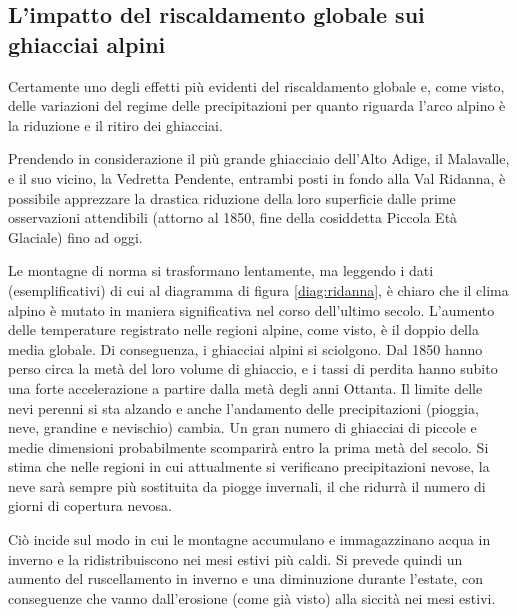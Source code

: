 \documentclass[14pt,a4paper]{article}
\begin{document}
	\subsection{L'impatto del riscaldamento globale sui ghiacciai alpini}
		Certamente uno degli effetti più evidenti del riscaldamento globale e, come visto, delle variazioni del regime delle precipitazioni  per quanto riguarda l'arco alpino è la riduzione e il ritiro dei ghiacciai.
		
		Prendendo in considerazione il più grande ghiacciaio dell'Alto Adige, il Malavalle, e il suo vicino, la Vedretta Pendente, entrambi posti in fondo alla Val Ridanna, è possibile apprezzare la drastica riduzione della loro superficie dalle prime osservazioni attendibili (attorno al 1850, fine della cosiddetta Piccola Età Glaciale) fino ad oggi. \cite{monteneve}
		
		Le montagne di norma si trasformano lentamente, ma leggendo i dati (esemplificativi) di cui al diagramma di figura \ref{diag:ridanna}, è chiaro che il clima alpino è mutato in
		maniera significativa nel corso dell'ultimo secolo. L'aumento delle temperature registrato nelle regioni alpine, come visto, è il doppio della media
		globale. Di conseguenza, i ghiacciai alpini si sciolgono. Dal 1850 hanno perso circa la metà del loro volume di
		ghiaccio, e i tassi di perdita hanno subito una forte accelerazione a partire dalla metà degli anni Ottanta.
		Il limite delle nevi perenni si sta alzando e anche l'andamento delle precipitazioni (pioggia, neve, grandine e
		nevischio) cambia. Un gran numero di ghiacciai di piccole e medie dimensioni probabilmente scomparirà entro la
		prima metà del secolo. Si stima che nelle regioni in cui attualmente si verificano precipitazioni nevose, la neve sarà
		sempre più sostituita da piogge invernali, il che ridurrà il numero di giorni di copertura nevosa. 
		
		Ciò incide sul modo in cui le montagne accumulano e immagazzinano acqua in inverno e la ridistribuiscono nei mesi estivi più caldi. Si prevede quindi un aumento del ruscellamento in inverno e una diminuzione durante l'estate, con conseguenze che vanno dall'erosione (come già visto) alla siccità nei mesi estivi.
		
\end{document}
